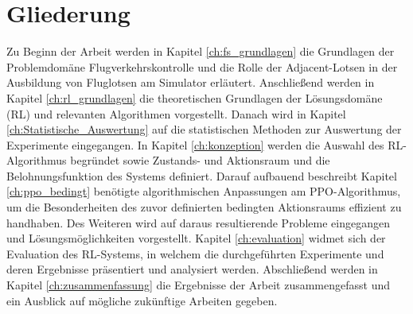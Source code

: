 \section{Gliederung}
\label{sec:intro:structure}
Zu Beginn der Arbeit werden in Kapitel \ref{ch:fs_grundlagen} die Grundlagen der Problemdomäne Flugverkehrskontrolle und die Rolle der Adjacent-Lotsen in der Ausbildung von Fluglotsen am Simulator erläutert.
Anschließend werden in Kapitel \ref{ch:rl_grundlagen} die theoretischen Grundlagen der Lösungsdomäne (\ac{RL}) und relevanten Algorithmen vorgestellt. 
Danach wird in Kapitel \ref{ch:Statistische_Auswertung} auf die statistischen Methoden zur Auswertung der Experimente eingegangen.
In Kapitel \ref{ch:konzeption} werden die Auswahl des \ac{RL}\hyp{}Algorithmus begründet sowie Zustands- und Aktionsraum und die Belohnungsfunktion des Systems definiert.
Darauf aufbauend beschreibt Kapitel \ref{ch:ppo_bedingt} benötigte algorithmischen Anpassungen am \ac{PPO}\hyp{}Algorithmus, um die Besonderheiten des zuvor definierten bedingten Aktionsraums effizient zu handhaben. Des Weiteren wird auf daraus resultierende Probleme eingegangen und Lösungsmöglichkeiten vorgestellt.
Kapitel \ref{ch:evaluation} widmet sich der Evaluation des \ac{RL}-Systems, in welchem die durchgeführten Experimente und deren Ergebnisse präsentiert und analysiert werden.
Abschließend werden in Kapitel \ref{ch:zusammenfassung} die Ergebnisse der Arbeit zusammengefasst und ein Ausblick auf mögliche zukünftige Arbeiten gegeben.

